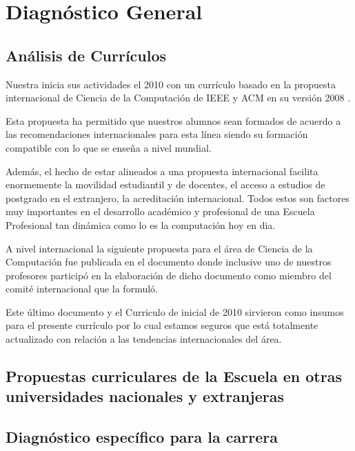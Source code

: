 \section{Diagnóstico General}

\subsection{Análisis de Currículos}
Nuestra \SchoolFullName inicia sus actividades el 2010 con un currículo basado en la propuesta internacional de 
Ciencia de la Computación de IEEE y ACM en su versión 2008 \cite{ComputerScience2008}.

Esta propuesta ha permitido que nuestros alumnos sean formados de acuerdo a las recomendaciones internacionales para esta línea
siendo su formación compatible con lo que se enseña a nivel mundial.

Además, el hecho de estar alineados a una propuesta internacional facilita enormemente la movilidad estudiantil y de docentes,
el acceso a estudios de postgrado en el extranjero, la acreditación internacional. Todos estos son factores muy importantes en el 
desarrollo académico y profesional de una Escuela Profesional tan dinámica como lo es la computación hoy en dia.

A nivel internacional la siguiente propuesta para el área de Ciencia de la Computación fue publicada en el documento \cite{CS2013} donde 
inclusive uno de nuestros profesores participó en la elaboración de dicho documento como miembro del comité internacional que la formuló.

Este último documento \cite{CS2013} y el Curriculo de inicial de 2010 sirvieron como insumos para el presente currículo 
por lo cual estamos seguros que está totalmente actualizado con relación a las tendencias internacionales del área.

\subsection{Propuestas curriculares de la Escuela en otras universidades nacionales y extranjeras}


\subsection{Diagnóstico específico para la carrera}

